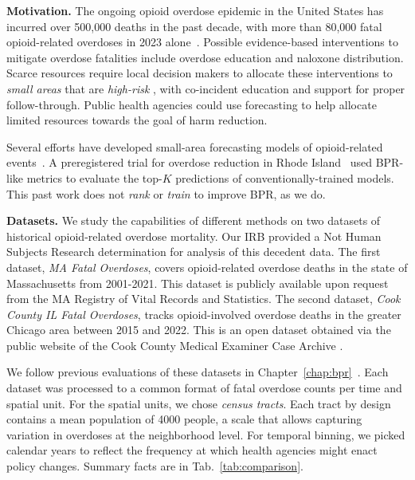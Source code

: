 \textbf{Motivation.}
The ongoing opioid overdose epidemic in the United States has incurred over 500,000 deaths in the past decade, with more than 80,000 fatal opioid-related overdoses in 2023 alone~\citep{cdc_vrss_2025}.
Possible evidence-based interventions to mitigate overdose fatalities include overdose education and naloxone distribution. Scarce resources require local decision makers to allocate these interventions to \emph{small areas} that are \emph{high-risk} \cite{allen_provident_2024}, with co-incident education and support for proper follow-through. Public health agencies could use forecasting to help allocate limited resources towards the goal of harm reduction. 


Several efforts have developed small-area forecasting models of opioid-related events~\citep{marksMethodologicalApproachesPrediction2021,neillMachineLearningDrug2018,bauer_small_2023}. 
A preregistered trial for overdose reduction in Rhode Island~\citep{marshallPreventingOverdoseUsing2022} used BPR-like metrics to evaluate the top-$K$ predictions of conventionally-trained models. %
This past work does not \emph{rank} or \emph{train} to improve BPR, as we do.




\textbf{Datasets.}
We study the capabilities of different methods on two datasets of historical opioid-related overdose mortality. Our IRB provided a Not Human Subjects Research determination for analysis of this decedent data.
The first dataset, \emph{MA Fatal Overdoses}, covers opioid-related overdose deaths in the state of Massachusetts from 2001-2021. This dataset is publicly available upon request from the MA Registry of Vital Records and Statistics.
The second dataset, \emph{Cook County IL Fatal Overdoses}, tracks opioid-involved overdose deaths in the greater Chicago area between 2015 and 2022. This is an open dataset obtained via the public website of the Cook County Medical Examiner Case Archive \citep{cookcountyilMedicalExaminerCase2014}.


We follow previous evaluations of these datasets in Chapter~\ref{chap:bpr}~\citep{heutonSpatiotemporalForecastingOpioidrelated2024}. 
Each dataset was processed to a common format of fatal overdose counts per time and spatial unit.
For the spatial units, we chose \emph{census tracts}. Each tract by design contains a mean population of 4000 people, a scale that allows capturing variation in overdoses at the neighborhood level.
For temporal binning, we picked calendar years to reflect the frequency at which health agencies might enact policy changes.
Summary facts are in Tab.~\ref{tab:comparison}.

